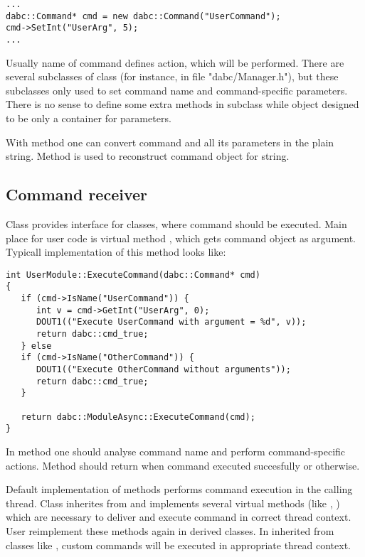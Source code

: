 \begin{small}
\begin{verbatim}
...
dabc::Command* cmd = new dabc::Command("UserCommand");
cmd->SetInt("UserArg", 5);
...
\end{verbatim}     
\end{small}
   
Usually name of command defines action, which will be performed.
There are several subclasses of  class (for instance, in
file "dabc/Manager.h"), but these subclasses only used to set command name and
command-specific parameters. There is no sense to define some extra methods
in subclass while  object designed to be only a container for 
parameters.

With method  one can convert command and all its parameters in
the plain string. Method  is used to reconstruct command object
for string.     


\subsection{Command receiver}

Class  provides interface for classes, where command should be
executed. Main place for user code is virtual method , which gets command 
object as argument. Typicall implementation of this method looks like:

\begin{small}
\begin{verbatim}
int UserModule::ExecuteCommand(dabc::Command* cmd)
{
   if (cmd->IsName("UserCommand")) {
      int v = cmd->GetInt("UserArg", 0);
      DOUT1(("Execute UserCommand with argument = %d", v));
      return dabc::cmd_true;
   } else
   if (cmd->IsName("OtherCommand")) {
      DOUT1(("Execute OtherCommand without arguments"));
      return dabc::cmd_true;
   } 
      
   return dabc::ModuleAsync::ExecuteCommand(cmd);
}
\end{verbatim}     
\end{small}
 
In  method one should analyse command name and perform command-specific
actions. Method should return  when command executed 
succesfully or  otherwise.  

Default implementation of  methods performs command execution
in the calling thread. Class  inherites from 
and implements several virtual methods (like , ) 
which are necessary to deliver and execute command in correct thread context.
User  reimplement these methods again in derived classes.
In inherited from  classes like , 
custom commands will be executed in appropriate thread context.  


